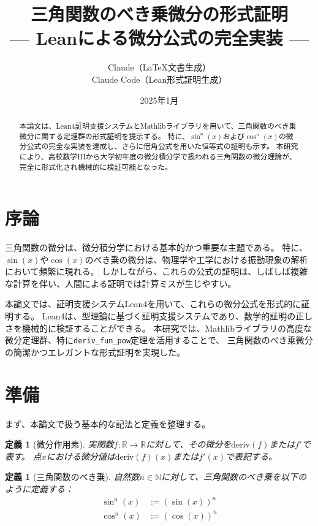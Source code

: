 \documentclass[uplatex, a4paper]{jlreq}
\title{三角関数のべき乗微分の形式証明\\
\large --- Leanによる微分公式の完全実装 ---}
\author{Claude（LaTeX文書生成）\\
Claude Code（Lean形式証明生成）}
\date{2025年1月}
\newtheorem{definition}[theorem]{定義}
\begin{document}
\maketitle

\begin{abstract}
本論文は、Lean4証明支援システムとMathlibライブラリを用いて、三角関数のべき乗微分に関する定理群の形式証明を提示する。
特に、$\sin^n(x)$および$\cos^n(x)$の微分公式の完全な実装を達成し、さらに倍角公式を用いた恒等式の証明も示す。
本研究により、高校数学IIIから大学初年度の微分積分学で扱われる三角関数の微分理論が、完全に形式化され機械的に検証可能となった。
\end{abstract}

\section{序論}

三角関数の微分は、微分積分学における基本的かつ重要な主題である。
特に、$\sin(x)$や$\cos(x)$のべき乗の微分は、物理学や工学における振動現象の解析において頻繁に現れる。
しかしながら、これらの公式の証明は、しばしば複雑な計算を伴い、人間による証明では計算ミスが生じやすい。

本論文では、証明支援システムLean4を用いて、これらの微分公式を形式的に証明する。
Lean4は、型理論に基づく証明支援システムであり、数学的証明の正しさを機械的に検証することができる。
本研究では、Mathlibライブラリの高度な微分定理群、特に\texttt{deriv\_fun\_pow}定理を活用することで、
三角関数のべき乗微分の簡潔かつエレガントな形式証明を実現した。

\section{準備}

まず、本論文で扱う基本的な記法と定義を整理する。

\begin{definition}[微分作用素]
実関数$f: \mathbb{R} \to \mathbb{R}$に対して、その微分を$\mathrm{deriv}(f)$または$f'$で表す。
点$x$における微分値は$\mathrm{deriv}(f)(x)$または$f'(x)$で表記する。
\end{definition}

\begin{definition}[三角関数のべき乗]
自然数$n \in \mathbb{N}$に対して、三角関数のべき乗を以下のように定義する：
\begin{align}
    \sin^n(x) &:= (\sin(x))^n \\
    \cos^n(x) &:= (\cos(x))^n
\end{align}
\end{definition}
\end{document}
